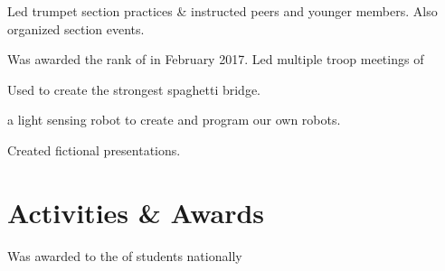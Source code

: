 \documentclass[]{deedy-resume-openfont}
\begin{document}
\vspace{\topsep} %
\begin{tightemize}\item Led trumpet section practices \& instructed peers and younger members. Also organized section events. 
\end{tightemize}
\sectionsep

\vspace{\topsep} %
\begin{tightemize}\item Was awarded the rank of  in February 2017. Led multiple troop meetings of 
\end{tightemize}
\sectionsep

\vspace{\topsep} %
\begin{tightemize}
\item Used  to create the strongest spaghetti bridge.
\item {} a light sensing robot to create  and program our own robots.
\item Created fictional  presentations.
\end{tightemize}
\sectionsep


\section{Activities \& Awards}
\vspace{0.5mm}
\begin{tightemize}
\item[] Was awarded to the  of students nationally
\end{tightemize}
\sectionsep
\end{document}
